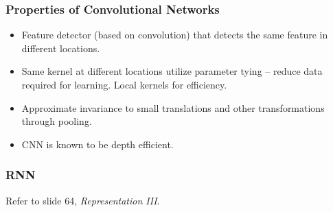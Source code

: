 \documentclass{article}
\begin{document}
   \subsubsection{Properties of Convolutional Networks}
   \begin{itemize}
   \item Feature detector (based on convolution) that detects the same feature in different locations.
   \item Same kernel at different locations utilize parameter tying -- reduce data required for learning. Local kernels for efficiency.
   \item Approximate invariance to small translations and other transformations through pooling.
   \item CNN is known to be depth efficient.
   \end{itemize}
   
   \subsubsection{RNN}
   Refer to slide 64, \textit{Representation III}.
   
\end{document}
